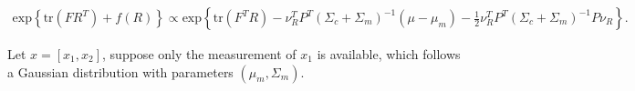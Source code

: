 \documentclass[10pt]{article}
\newcommand{\tr}[1]{\ensuremath{\mathrm{tr}\left( #1 \right)}}
\newcommand{\expb}[1]{\ensuremath{\mathrm{exp}\left\{#1\right\}}}
\begin{document}
\begin{align}
	\expb{\tr{FR^T}+f(R)} \propto \expb{\tr{F^TR} - \nu_R^TP^T(\Sigma_c+\Sigma_m)^{-1}(\mu-\mu_m) - \frac{1}{2}\nu_R^TP^T(\Sigma_c+\Sigma_m)^{-1}P\nu_R}.
\end{align}

Let $x = [x_1,x_2]$, suppose only the measurement of $x_1$ is available, which follows a Gaussian distribution with parameters $(\mu_m,\Sigma_m)$.
\end{document}
